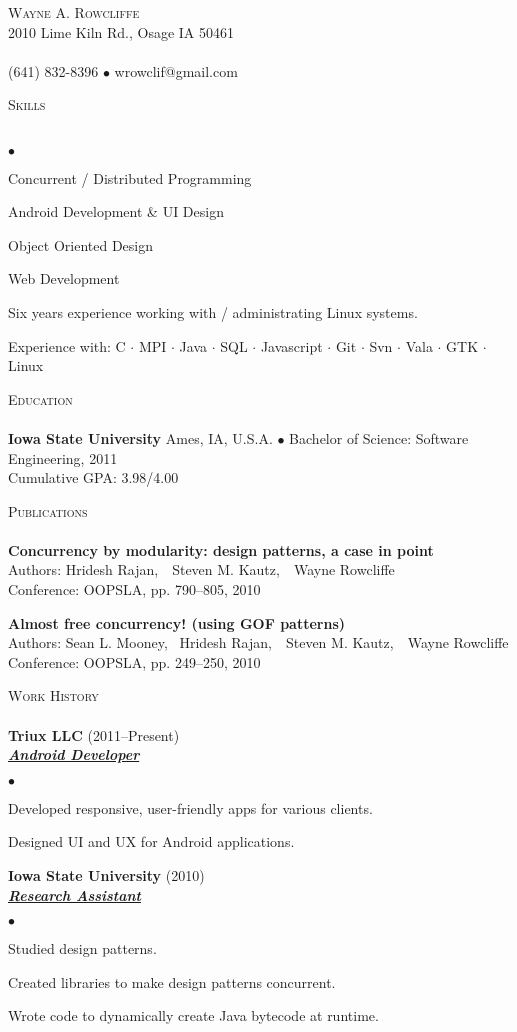 \documentclass{article}
\newcommand{\lineunder} {
	\vspace*{-8pt} \\ \hspace*{-18pt} \hrulefill \\
}
\newcommand{\header}[1] {
	{\hspace*{-15pt}\vspace*{6pt} \textsc{#1}} \vspace*{-6pt} \lineunder
}
\newcommand{\employer}[3] {
	{ \textbf{#1} (#2)\\ \underline{\textbf{\emph{#3}}}\\  }
}
\newcommand{\paper}[5] {
	{\textbf{#1}\\ \hspace*{15pt}Authors: #2\\ \hspace*{15pt}#3, #4, #5\\ \vspace*{8pt}}
}
\newcommand{\contact}[3] {
	\vspace*{-8pt}\begin{center}{\LARGE \scshape {#1}}\\#2 \lineunder#3\end{center}\vspace*{-8pt}
}
\newenvironment{achievements} {
	\begin{list}{$\bullet$}
		{\topsep 0pt \itemsep -2pt}
	}{
		\vspace*{4pt}\end{list}
	}
\newcommand{\school}[4] {
	\textbf{#1} #2 $\bullet$ #3\\
	\hspace*{15pt}#4 \\
	\vspace*{5pt}
}
\newcommand{\subject}[1] {\mbox{#1} $\cdot$}
\newcommand{\lastsubject}[1] {\mbox{#1}}
\begin{document}
\small
\smallskip
\vspace*{-44pt}

\contact{Wayne A. Rowcliffe}
{2010 Lime Kiln Rd., Osage IA 50461}
{(641) 832-8396 $\bullet$ wrowclif@gmail.com}%

\header{Skills}

	\begin{achievements}
		\item{Concurrent / Distributed Programming}
		\item{Android Development \& UI Design}
		\item{Object Oriented Design}
		\item{Web Development}
		\item{Six years experience working with / administrating Linux systems.}
		\item{Experience with:
			\subject{C}
			\subject{MPI}
			\subject{Java}
			\subject{SQL}
			\subject{Javascript}
			\subject{Git}
			\subject{Svn}
			\subject{Vala}
			\subject{GTK}
			\lastsubject{Linux}
		}

	\end{achievements}

\header{Education}

	\school{Iowa State University}{Ames, IA, U.S.A.}{Bachelor of Science: Software Engineering, 2011}
	{Cumulative GPA: 3.98/4.00}

\header{Publications}

	\paper{Concurrency by modularity: design patterns, a case in point}{Hridesh Rajan,~ Steven M. Kautz,~ Wayne Rowcliffe}
		{Conference: OOPSLA}{pp. 790--805}{2010}
	\paper{Almost free concurrency! (using GOF patterns)}{Sean L. Mooney,~ Hridesh Rajan,~ Steven M. Kautz,~ Wayne Rowcliffe}
		{Conference: OOPSLA}{pp. 249--250}{2010}


\header{Work History}

	\employer{Triux LLC}{2011--Present}{Android Developer}
		\begin{achievements}
			\item{Developed responsive, user-friendly apps for various clients.}
			\item{Designed UI and UX for Android applications.}
		\end{achievements}

	\employer{Iowa State University}{2010}{Research Assistant}
		\begin{achievements}
			\item{Studied design patterns.}
			\item{Created libraries to make design patterns concurrent.}
			\item{Wrote code to dynamically create Java bytecode at runtime.}
		\end{achievements}
\end{document}
